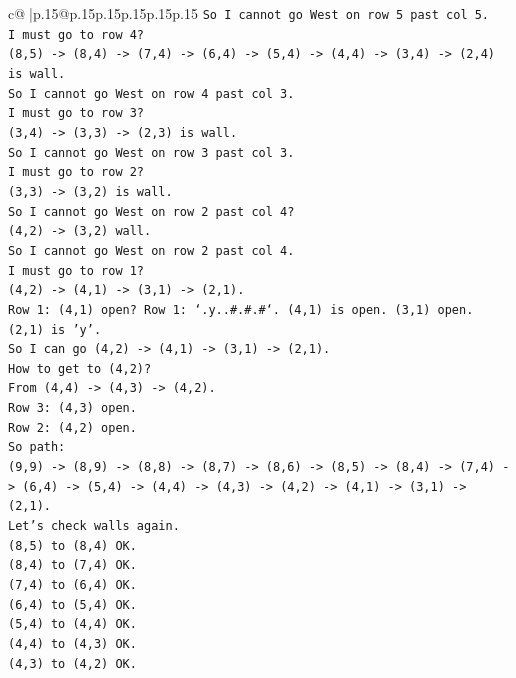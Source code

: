 \documentclass{article}
\begin{document}
{\begin{supertabular}{c@{$\;$}|p{.15\linewidth}@{}p{.15\linewidth}p{.15\linewidth}p{.15\linewidth}p{.15\linewidth}p{.15\linewidth}}
{{{\texttt{So I cannot go West on row 5 past col 5.} \\
\texttt{I must go to row 4?} \\
\texttt{(8,5) {-}> (8,4) {-}> (7,4) {-}> (6,4) {-}> (5,4) {-}> (4,4) {-}> (3,4) {-}> (2,4) is wall.} \\
\texttt{So I cannot go West on row 4 past col 3.} \\
\texttt{I must go to row 3?} \\
\texttt{(3,4) {-}> (3,3) {-}> (2,3) is wall.} \\
\texttt{So I cannot go West on row 3 past col 3.} \\
\texttt{I must go to row 2?} \\
\texttt{(3,3) {-}> (3,2) is wall.} \\
\texttt{So I cannot go West on row 2 past col 4?} \\
\texttt{(4,2) {-}> (3,2) wall.} \\
\texttt{So I cannot go West on row 2 past col 4.} \\
\texttt{I must go to row 1?} \\
\texttt{(4,2) {-}> (4,1) {-}> (3,1) {-}> (2,1).} \\
\texttt{Row 1: (4,1) open? Row 1: `.y..\#.\#.\#`. (4,1) is open. (3,1) open. (2,1) is 'y'.} \\
\texttt{So I can go (4,2) {-}> (4,1) {-}> (3,1) {-}> (2,1).} \\
\texttt{How to get to (4,2)?} \\
\texttt{From (4,4) {-}> (4,3) {-}> (4,2).} \\
\texttt{Row 3: (4,3) open.} \\
\texttt{Row 2: (4,2) open.} \\
\texttt{So path:} \\
\texttt{(9,9) {-}> (8,9) {-}> (8,8) {-}> (8,7) {-}> (8,6) {-}> (8,5) {-}> (8,4) {-}> (7,4) {-}> (6,4) {-}> (5,4) {-}> (4,4) {-}> (4,3) {-}> (4,2) {-}> (4,1) {-}> (3,1) {-}> (2,1).} \\
\texttt{Let's check walls again.} \\
\texttt{(8,5) to (8,4) OK.} \\
\texttt{(8,4) to (7,4) OK.} \\
\texttt{(7,4) to (6,4) OK.} \\
\texttt{(6,4) to (5,4) OK.} \\
\texttt{(5,4) to (4,4) OK.} \\
\texttt{(4,4) to (4,3) OK.} \\
\texttt{(4,3) to (4,2) OK.} \\
}}}
\end{supertabular}}
\end{document}
